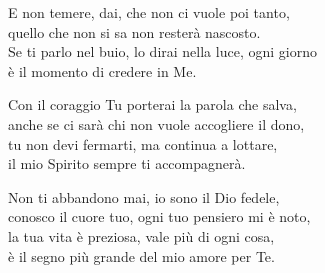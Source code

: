 

\spazio

\strofa E non temere, dai, che non ci vuole poi tanto,\\
quello che non si sa non resterà nascosto.\\
Se ti parlo nel buio, lo dirai nella luce, ogni giorno\\
è il momento di credere in Me.

\spazio


\spazio

\strofa Con il coraggio Tu porterai la parola che salva,\\
anche se ci sarà chi non vuole accogliere il dono,\\
tu non devi fermarti, ma continua a lottare,\\
il mio Spirito sempre ti accompagnerà.

\spazio


\spazio

\strofa Non ti abbandono mai, io sono il Dio fedele,\\
conosco il cuore tuo, ogni tuo pensiero mi è noto,\\
la tua vita è preziosa, vale più di ogni cosa,\\
è il segno più grande del mio amore per Te.

\spazio

